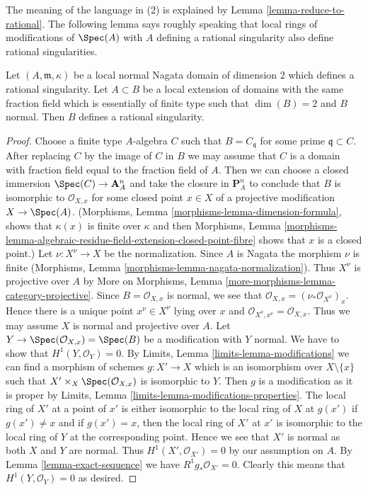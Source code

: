\noindent
The meaning of the language in (2) is explained by
Lemma \ref{lemma-reduce-to-rational}. The following lemma
says roughly speaking that local rings of modifications of $\Spec(A)$
with $A$ defining a rational singularity also define rational
singularities.

\begin{lemma}
\label{lemma-rational-propagates}
Let $(A, \mathfrak m, \kappa)$ be a local normal Nagata domain of
dimension $2$ which defines a rational singularity. Let $A \subset B$
be a local extension of domains with the same fraction field
which is essentially of finite type such
that $\dim(B) = 2$ and $B$ normal. Then $B$ defines a rational singularity.
\end{lemma}

\begin{proof}
Choose a finite type $A$-algebra $C$ such that $B = C_\mathfrak q$
for some prime $\mathfrak q \subset C$. After replacing
$C$ by the image of $C$ in $B$ we may assume that $C$ is a domain
with fraction field equal to the fraction field of $A$.
Then we can choose a closed immersion $\Spec(C) \to \mathbf{A}^n_A$
and take the closure in $\mathbf{P}^n_A$ to conclude that $B$
is isomorphic to $\mathcal{O}_{X, x}$ for some closed point $x \in X$
of a projective modification $X \to \Spec(A)$.
(Morphisms, Lemma \ref{morphisms-lemma-dimension-formula},
shows that $\kappa(x)$ is finite over $\kappa$ and then
Morphisms, Lemma
\ref{morphisms-lemma-algebraic-residue-field-extension-closed-point-fibre}
shows that $x$ is a closed point.)
Let $\nu : X^\nu \to X$ be the normalization.
Since $A$ is Nagata the morphism $\nu$ is finite (Morphisms, Lemma
\ref{morphisms-lemma-nagata-normalization}).
Thus $X^\nu$ is projective over $A$ by
More on Morphisms, Lemma
\ref{more-morphisms-lemma-category-projective}.
Since $B = \mathcal{O}_{X, x}$ is normal, we see that
$\mathcal{O}_{X, x} = (\nu_*\mathcal{O}_{X^\nu})_x$.
Hence there is a unique point $x^\nu \in X^\nu$ lying over $x$
and $\mathcal{O}_{X^\nu, x^\nu} = \mathcal{O}_{X, x}$.
Thus we may assume $X$ is normal and projective over $A$.
Let $Y \to \Spec(\mathcal{O}_{X, x}) = \Spec(B)$
be a modification with $Y$ normal.
We have to show that $H^1(Y, \mathcal{O}_Y) = 0$. By
Limits, Lemma \ref{limits-lemma-modifications}
we can find a morphism of schemes $g : X' \to X$ which is an isomorphism
over $X \setminus \{x\}$ such that $X' \times_X \Spec(\mathcal{O}_{X, x})$
is isomorphic to $Y$. Then $g$ is a modification as it is proper by
Limits, Lemma \ref{limits-lemma-modifications-properties}.
The local ring of $X'$ at a point of $x'$ is either isomorphic
to the local ring of $X$ at $g(x')$ if $g(x') \not = x$ and
if $g(x') = x$, then the local ring of $X'$ at $x'$ is isomorphic
to the local ring of $Y$ at the corresponding point. Hence we see
that $X'$ is normal as both $X$ and $Y$ are normal.
Thus $H^1(X', \mathcal{O}_{X'}) = 0$ by our assumption on $A$.
By Lemma \ref{lemma-exact-sequence} we have $R^1g_*\mathcal{O}_{X'} = 0$.
Clearly this means that $H^1(Y, \mathcal{O}_Y) = 0$ as desired.
\end{proof}

